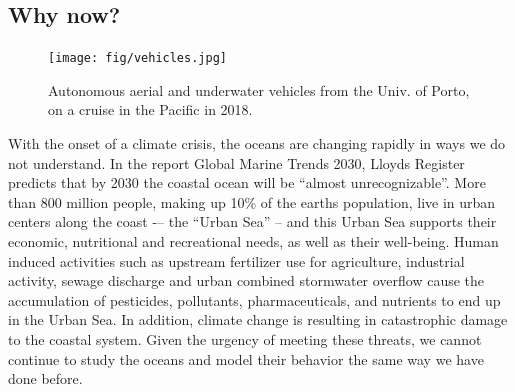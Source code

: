 \fi

\ifkeck

\fi


\subsection{Why now?}

\begin{figure}[!t]
  \centering
  \texttt{[image: fig/vehicles.jpg]}
  \caption{Autonomous aerial and underwater vehicles from the Univ. of
    Porto, on a cruise in the Pacific in 2018.}
\label{fig:vehicles}
\end{figure}

With the onset of a climate crisis, the oceans are changing rapidly in
ways we do not understand.  In the report Global Marine Trends 2030,
Lloyds Register predicts that by 2030 the coastal ocean will be
“almost unrecognizable”. More than 800 million people, making up 10\%
of the earths population, live in urban centers along the coast -– the
“Urban Sea” -- and this Urban Sea supports their economic, nutritional
and recreational needs, as well as their well-being. Human induced
activities such as upstream fertilizer use for agriculture, industrial
activity, sewage discharge and urban combined stormwater overflow
cause the accumulation of pesticides, pollutants, pharmaceuticals, and
nutrients to end up in the Urban Sea.  In addition, climate change is
resulting in catastrophic damage to the coastal system.  Given the
urgency of meeting these threats, we cannot continue to study the
oceans and model their behavior the same way we have done before.




